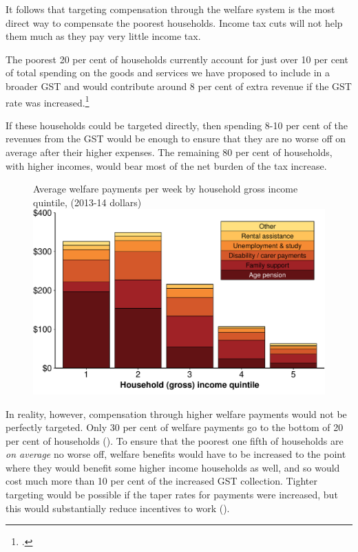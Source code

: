 It follows that targeting compensation through the welfare system is the most direct way to compensate the poorest households. Income tax cuts will not help them much as they pay very little income tax. 

The poorest 20 per cent of households currently account for just over 10 per cent of total spending on the goods and services we have proposed to include in a broader GST and would contribute around 8 per cent of extra revenue if the GST rate was increased.\footcite{ABS2015HouseholdIncomeWealth1314}

If these households could be targeted directly, then spending 8-10 per cent of the revenues from the GST would be enough to ensure that they are no worse off on average after their higher expenses. The remaining 80 per cent of households, with higher incomes, would bear most of the net burden of the tax increase.

\begin{figure}
%
{Average welfare payments per week by household gross income quintile, (2013-14 dollars)}
\includegraphics[width=\columnwidth]{atlas/figure/GST-Figure-6-1.pdf}

\end{figure}

In reality, however, compensation through higher welfare payments would not be perfectly targeted. Only 30 per cent of welfare payments go to the bottom of 20 per cent of households (). To ensure that the poorest one fifth of households are \emph{on average} no worse off, welfare benefits would have to be increased to the point where they would benefit some higher income households as well, and so would cost much more than 10 per cent of the increased GST collection. Tighter targeting would be possible if the taper rates for payments were increased, but this would substantially reduce incentives to work (). 

